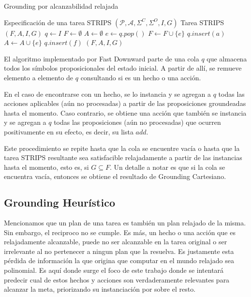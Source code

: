 \begin{algorithm}
    \caption{Grounding por alcanzabilidad relajada}\label{alg:cap}
    \begin{algorithmic}
    \Require Especificación de una tarea STRIPS $(\mathcal{P}, \mathcal{A},
    \Sigma^{C}, \Sigma^{O}, I, G)$
    \Ensure Tarea STRIPS $(F, A, I, G)$ 
    \State $q \gets I$
    \State $F \gets \emptyset$
    \State $A \gets \emptyset$
    \State $e \gets q.pop()$
        \State $F \gets F \cup \{e\}$
            \State $q.insert(a)$
        \EndFor
    \Else
        \State $A \gets A \cup \{e\}$
            \State $q.insert(f)$
        \EndFor
    \EndIf
    \EndWhile
    \State \Return $(F, A, I, G)$
    \end{algorithmic}
\end{algorithm}

El algoritmo implementado por Fast Downward parte de una cola $q$ que almacena
todos los símbolos proposicionales del estado inicial. A partir de allí, se
remueve elemento a elemento de $q$ consultando si es un hecho o una acción.

En el caso de encontrarse con un hecho, se lo instancia y se agregan a $q$ todas
las acciones aplicables (aún no procesadas) a partir de las proposiciones
groundeadas hasta el momento. Caso contrario, se obtiene una acción que también
se instancia y se agregan a $q$ todas las proposiciones (aún no procesadas) que
ocurren positivamente en su efecto, es decir, su lista $add$.

Este procedimiento se repite hasta que la cola se encuentre vacía o hasta que la
tarea STRIPS resultante sea satisfacible relajadamente a partir de las
instancias hasta el momento, esto es, si $G \subseteq F$. Un detalle a notar
es que si la cola se encuentra vacía, entonces se obtiene el resultado de
Grounding Cartesiano.

\subsection{Grounding Heurístico}

Mencionamos que un plan de una tarea es también un plan relajado de la misma.
Sin embargo, el reciproco no se cumple. Es más, un hecho o una acción que es
relajadamente alcanzable, puede no ser alcanzable en la tarea original o ser
irrelevante al no pertenecer a ningun plan que la resuelva. Es justamente esta
pérdida de información la que origina que computar en el mundo relajado sea
polinomial. Es aquí donde surge el foco de este trabajo donde se intentará
predecir cual de estos hechos y acciones son verdaderamente relevantes para
alcanzar la meta, priorizando su instanciación por sobre el resto.

